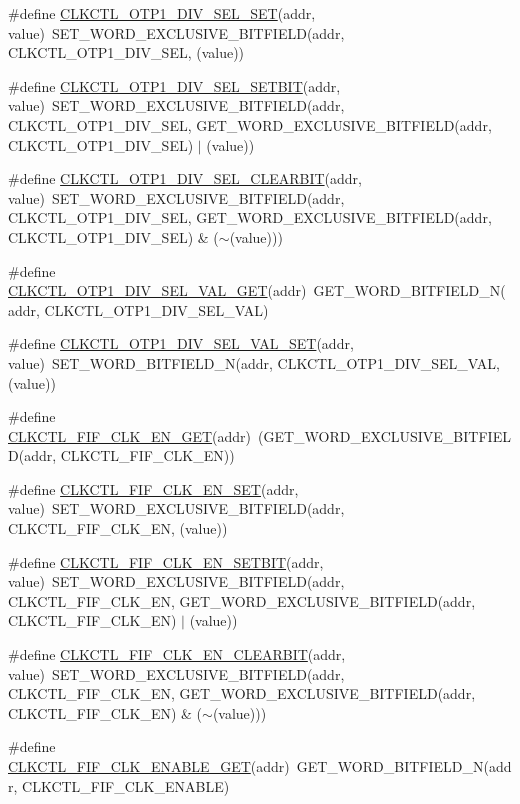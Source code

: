 \begin{DoxyCompactItemize}
\item 
\#define \hyperlink{a00544_a750ca2d95de1156f5a3d43accdb8f825}{CLKCTL\_\-OTP1\_\-DIV\_\-SEL\_\-SET}(addr, value)~SET\_\-WORD\_\-EXCLUSIVE\_\-BITFIELD(addr, CLKCTL\_\-OTP1\_\-DIV\_\-SEL, (value))
\item 
\#define \hyperlink{a00544_af7d878e1e68e394d82fa69108ccc182c}{CLKCTL\_\-OTP1\_\-DIV\_\-SEL\_\-SETBIT}(addr, value)~SET\_\-WORD\_\-EXCLUSIVE\_\-BITFIELD(addr, CLKCTL\_\-OTP1\_\-DIV\_\-SEL, GET\_\-WORD\_\-EXCLUSIVE\_\-BITFIELD(addr, CLKCTL\_\-OTP1\_\-DIV\_\-SEL) $|$ (value))
\item 
\#define \hyperlink{a00544_a5ec0afd7664fc8de8dec0d06e998b469}{CLKCTL\_\-OTP1\_\-DIV\_\-SEL\_\-CLEARBIT}(addr, value)~SET\_\-WORD\_\-EXCLUSIVE\_\-BITFIELD(addr, CLKCTL\_\-OTP1\_\-DIV\_\-SEL, GET\_\-WORD\_\-EXCLUSIVE\_\-BITFIELD(addr, CLKCTL\_\-OTP1\_\-DIV\_\-SEL) \& ($\sim$(value)))
\item 
\#define \hyperlink{a00544_ab5749eda99dffb0819af4dfc1376e875}{CLKCTL\_\-OTP1\_\-DIV\_\-SEL\_\-VAL\_\-GET}(addr)~GET\_\-WORD\_\-BITFIELD\_\-N(addr, CLKCTL\_\-OTP1\_\-DIV\_\-SEL\_\-VAL)
\item 
\#define \hyperlink{a00544_ad7edc442e079cb87525f3d8f5f30f62f}{CLKCTL\_\-OTP1\_\-DIV\_\-SEL\_\-VAL\_\-SET}(addr, value)~SET\_\-WORD\_\-BITFIELD\_\-N(addr, CLKCTL\_\-OTP1\_\-DIV\_\-SEL\_\-VAL, (value))
\item 
\#define \hyperlink{a00544_aaa3051bba43d6b1f73db716b65a1cb5e}{CLKCTL\_\-FIF\_\-CLK\_\-EN\_\-GET}(addr)~(GET\_\-WORD\_\-EXCLUSIVE\_\-BITFIELD(addr, CLKCTL\_\-FIF\_\-CLK\_\-EN))
\item 
\#define \hyperlink{a00544_af1be1f7491f957e6dea1f8d40f1e6be4}{CLKCTL\_\-FIF\_\-CLK\_\-EN\_\-SET}(addr, value)~SET\_\-WORD\_\-EXCLUSIVE\_\-BITFIELD(addr, CLKCTL\_\-FIF\_\-CLK\_\-EN, (value))
\item 
\#define \hyperlink{a00544_a23e21ffbf50b5e18bfff3ee38c5e7f2d}{CLKCTL\_\-FIF\_\-CLK\_\-EN\_\-SETBIT}(addr, value)~SET\_\-WORD\_\-EXCLUSIVE\_\-BITFIELD(addr, CLKCTL\_\-FIF\_\-CLK\_\-EN, GET\_\-WORD\_\-EXCLUSIVE\_\-BITFIELD(addr, CLKCTL\_\-FIF\_\-CLK\_\-EN) $|$ (value))
\item 
\#define \hyperlink{a00544_a8d9a775bf32af9cdab1dd8b436650383}{CLKCTL\_\-FIF\_\-CLK\_\-EN\_\-CLEARBIT}(addr, value)~SET\_\-WORD\_\-EXCLUSIVE\_\-BITFIELD(addr, CLKCTL\_\-FIF\_\-CLK\_\-EN, GET\_\-WORD\_\-EXCLUSIVE\_\-BITFIELD(addr, CLKCTL\_\-FIF\_\-CLK\_\-EN) \& ($\sim$(value)))
\item 
\#define \hyperlink{a00544_a0390f7b56ab5405c26012ea6976ffbdd}{CLKCTL\_\-FIF\_\-CLK\_\-ENABLE\_\-GET}(addr)~GET\_\-WORD\_\-BITFIELD\_\-N(addr, CLKCTL\_\-FIF\_\-CLK\_\-ENABLE)

\end{DoxyCompactItemize}
